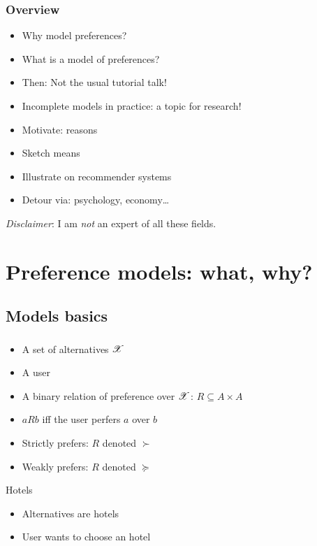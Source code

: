\documentclass[french,english]{beamer}
\begin{document}
\begin{frame}
	\frametitle{Overview}
	\begin{itemize}
		\item Why model preferences?
		\item What is a model of preferences?
		\item Then: Not the usual tutorial talk!
		\item Incomplete models in practice: a topic for research!
		\item Motivate: reasons
		\item Sketch means
		\item Illustrate on recommender systems
		\item Detour via: psychology, economy…
	\end{itemize}
	\emph{Disclaimer}: I am \emph{not} an expert of all these fields.
\end{frame}


\section[Preference models]{Preference models: what, why?}
\subsection{Models basics}
\begin{frame}
	\frametitle{\subsecname}
	\begin{itemize}
		\item A set of alternatives $\mathscr{X}$
		\item A user
		\item A binary relation of preference over $\mathscr{X}$: $R \subseteq A × A$
		\item $a R b$ iff the user perfers $a$ over $b$
		\item Strictly prefers: $R$ denoted $\succ$
		\item Weakly prefers: $R$ denoted $\succeq$
	\end{itemize}
	\begin{exampleblock}{Hotels}
		\begin{itemize}
			\item Alternatives are hotels
			\item User wants to choose an hotel
		\end{itemize}
	\end{exampleblock}
\end{frame}
\end{document}
